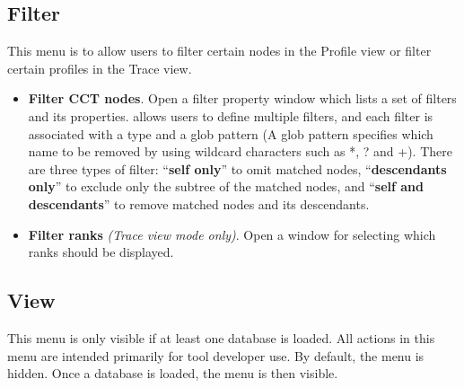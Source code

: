 \documentclass[english]{article}
\begin{document}

\subsection{Filter}
This menu is to allow users to filter certain nodes in the Profile view or filter certain profiles in the Trace view.
\begin{itemize}
 \item \textbf{Filter CCT nodes}.
  Open a filter property window which lists a set of filters and its properties.
 allows  users to define multiple filters, and each filter is associated with a type and a glob pattern (A glob pattern specifies which name to be removed by using wildcard characters such as *, ? and +).
There are three types of filter: ``\textbf{self only}'' to omit matched nodes,
``\textbf{descendants only}'' to exclude only the subtree of the matched nodes, and ``\textbf{self and descendants}'' to
remove matched nodes and its descendants.

 \item \textbf{Filter ranks} \emph{(Trace view mode only)}.
  Open a window for selecting which ranks should be displayed.

\end{itemize}


\subsection{View}
This menu is only visible if at least one database is loaded.
All actions in this menu are intended primarily for tool developer use.
By default, the menu is hidden. Once a database is loaded, the menu is then visible.
\end{document}

